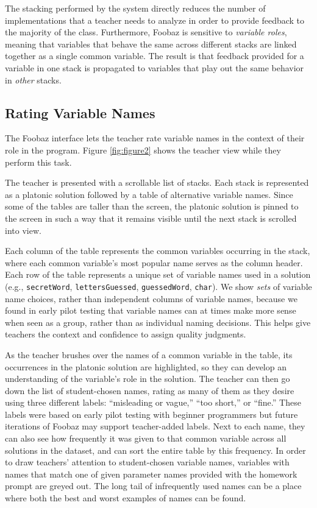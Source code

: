 {{The stacking performed by the system directly reduces the number of implementations that a teacher needs to analyze in order to provide feedback to the majority of the class. Furthermore, Foobaz is sensitive to \emph{variable roles}, meaning that variables that behave the same across different stacks are linked together as a single common variable. The result is that feedback provided for a variable in one stack is propagated to variables that play out the same behavior in \emph{other} stacks.

\subsection{Rating Variable Names}

The Foobaz interface lets the teacher rate variable names in the context of their role in the program. Figure \ref{fig:figure2} shows the teacher view while they perform this task. 

The teacher is presented with a scrollable list of stacks. Each stack is represented as a platonic solution followed by a table of alternative variable names. Since some of the tables are taller than the screen, the platonic solution is pinned to the screen in such a way that it remains visible until the next stack is scrolled into view.

Each column of the table represents the common variables occurring in the stack, where each common variable's most popular name serves as the column header. Each row of the table represents a unique set of variable names used in a solution (e.g., \texttt{secretWord}, \texttt{lettersGuessed}, \texttt{guessedWord}, \texttt{char}). We show \emph{sets} of variable name choices, rather than independent columns of variable names, because we found in early pilot testing that variable names can at times make more sense when seen as a group, rather than as individual naming decisions. This helps give teachers the context and confidence to assign quality judgments.

As the teacher brushes over the names of a common variable in the table, its occurrences in the platonic solution are highlighted, so they can develop an understanding of the variable's role in the solution. The teacher can then go down the list of student-chosen names, rating as many of them as they desire using three different labels: ``misleading or vague,'' ``too short,'' or ``fine.'' These labels were based on early pilot testing with beginner programmers but future iterations of Foobaz may support teacher-added labels. Next to each name, they can also see how frequently it was given to that common variable across all solutions in the dataset, and can sort the entire table by this frequency. In order to draw teachers' attention to student-chosen variable names, variables with names that match one of given parameter names provided with the homework prompt are greyed out. The long tail of infrequently used names can be a place where both the best and worst examples of names can be found.

}}
